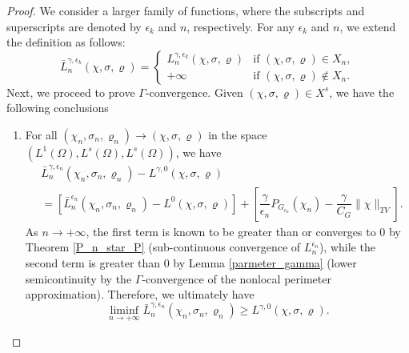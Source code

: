 \documentclass{amsart}
\begin{document}
\begin{proof}
    We consider a larger family of functions, where the subscripts and superscripts are denoted by \(\epsilon_k\) and \(n\), respectively. For any $\epsilon_k$ and $n$, we extend the definition as follows:
    \begin{equation}\label{bar_P}
        \bar L_n^{\gamma,{\epsilon_k}}(\chi,\sigma,\varrho)=
        \begin{cases} 
             L_n^{\gamma,{\epsilon_k}}(\chi,\sigma,\varrho) & \text{if } (\chi,\sigma,\varrho)\in X_n, \\
            +\infty & \text{if } (\chi,\sigma,\varrho)\notin X_n.
        \end{cases}
    \end{equation}
    Next, we proceed to prove \(\Gamma\)-convergence. Given \( (\chi, \sigma, \varrho) \in X^s \), we have the following conclusions
    \begin{enumerate}
        \item For all $(\chi_n, \sigma_n, \varrho_n){\rightarrow}(\chi, \sigma, \varrho)$ in the space $(L^1(\Omega),L^s(\Omega),L^s(\Omega))$, we have
        \begin{align*}
            &\bar L_n^{\gamma,\epsilon_n}(\chi_n, \sigma_n, \varrho_n)-L^{\gamma,0}(\chi, \sigma, \varrho)\\
            &=[\bar L_n^{\epsilon_n}(\chi_n, \sigma_n, \varrho_n)-L^0(\chi, \sigma, \varrho)]+\left[\dfrac{\gamma}{\epsilon_n}P_{G_{\epsilon_n}}(\chi_n)-\dfrac{\gamma}{C_G}\|\chi\|_{TV}\right].
        \end{align*}
        As $n\rightarrow +\infty$, the first term is known to be greater than or converges to 0 by Theorem \ref{P_n_star_P} (sub-continuous convergence of \( L_n^{\epsilon_n} \)), while the second term is greater than 0 by Lemma \ref{parmeter_gamma} (lower semicontinuity by the \(\Gamma\)-convergence of the nonlocal perimeter approximation). Therefore, we ultimately have 
        \begin{equation}
            \liminf_{n\to+\infty}\bar L_n^{\gamma,\epsilon_n}(\chi_n, \sigma_n, \varrho_n)\geq L^{\gamma,0}(\chi, \sigma, \varrho).\nonumber
        \end{equation} 
        

\end{enumerate}
\end{proof}
\end{document}
